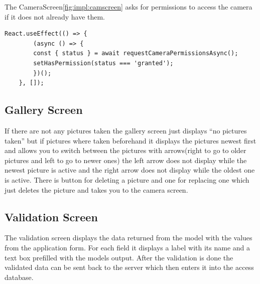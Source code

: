 The CameraScreen\ref{fig:impl:camscreen} asks for permissions to access the camera if it does not already have them.

\begin{lstlisting}[caption=Code for camera permissions,label=lst:impl:campermissions]
    React.useEffect(() => {
        (async () => {
        const { status } = await requestCameraPermissionsAsync();
        setHasPermission(status === 'granted');
        })();
    }, []);
\end{lstlisting}



\subsection{Gallery Screen}

If there are not any pictures taken the gallery screen just displays ``no pictures taken'' but if pictures where taken beforehand
it displays the pictures newest first and allows you to switch between the pictures with arrows(right to go to older pictures and left to go to newer ones)
the left arrow does not display while the newest picture is active and the right arrow does not display while the oldest one is active.
There is button for deleting a picture and one for replacing one which just deletes the picture and takes you to the camera screen.

\subsection{Validation Screen}

The validation screen displays the data returned from the model with the values from the application form.
For each field it displays a label with its name and a text box prefilled with the models output.
After the validation is done the validated data can be sent back to  the server which then enters it into the access database.

\FloatBarrier

